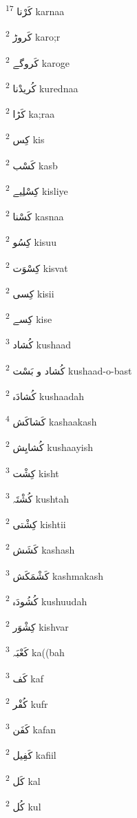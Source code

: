 \documentclass[12pt]{article}
\begin{document}
\begin{multicols}{5}
{\ur کَرْنا}   \textsuperscript{17} karnaa

{\ur کَروڑ}   \textsuperscript{2} karo;r

{\ur کَروگے}   \textsuperscript{2} karoge

{\ur کُریدْنا}   \textsuperscript{2} kurednaa

{\ur کَڑا}   \textsuperscript{2} ka;raa

{\ur کِس}   \textsuperscript{2} kis

{\ur کَسْب}   \textsuperscript{2} kasb

{\ur کِسْلِیے}   \textsuperscript{2} kisliye

{\ur کَسْنا}   \textsuperscript{2} kasnaa

{\ur کِسُو}   \textsuperscript{2} kisuu

{\ur کِسْوَت}   \textsuperscript{2} kisvat

{\ur کِسی}   \textsuperscript{2} kisii

{\ur کِسے}   \textsuperscript{2} kise

{\ur کُشاد}   \textsuperscript{3} kushaad

{\ur کُشاد و بَسْت}   \textsuperscript{2} kushaad-o-bast

{\ur کُشادَہ}   \textsuperscript{2} kushaadah

{\ur کَشاکَش}   \textsuperscript{4} kashaakash

{\ur کُشایِش}   \textsuperscript{2} kushaayish

{\ur کِشْت}   \textsuperscript{3} kisht

{\ur کُشْتَہ}   \textsuperscript{3} kushtah

{\ur کِشْتی}   \textsuperscript{2} kishtii

{\ur کَشَش}   \textsuperscript{2} kashash

{\ur کَشْمَکَش}   \textsuperscript{3} kashmakash

{\ur کُشُودَہ}   \textsuperscript{2} kushuudah

{\ur کِشْوَر}   \textsuperscript{2} kishvar

{\ur کَعْبَہ}   \textsuperscript{3} ka((bah

{\ur کَف}   \textsuperscript{3} kaf

{\ur کُفْر}   \textsuperscript{2} kufr

{\ur کَفَن}   \textsuperscript{3} kafan

{\ur کَفِیل}   \textsuperscript{2} kafiil

{\ur کَل}   \textsuperscript{2} kal

{\ur کُل}   \textsuperscript{2} kul


\end{multicols}
\end{document}
